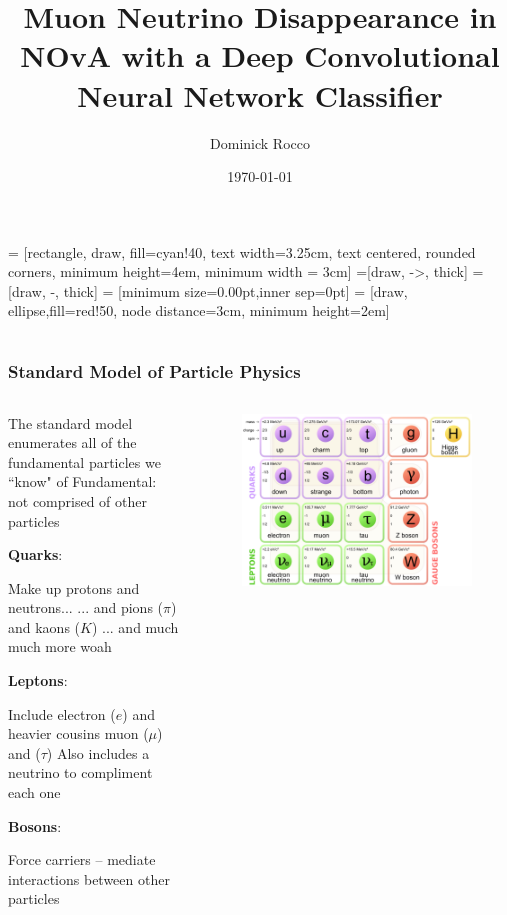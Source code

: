 \documentclass[10pt,professionalfonts,xcolor=table]{beamer}
\title[\numu Disappearance CNN]{Muon Neutrino Disappearance in NOvA with a Deep Convolutional Neural Network Classifier}
\author[D. Rocco]{Dominick Rocco}
\date{\today}
\institute{University of Minnesota}
\begin{document}
 = [rectangle, draw, fill=cyan!40,
   text width=3.25cm, text centered, rounded corners, minimum height=4em, minimum width = 3cm]
=[draw, ->, thick]
=[draw, -, thick]
 = [minimum size=0.00pt,inner sep=0pt]
 = [draw, ellipse,fill=red!50, node distance=3cm,
   minimum height=2em]

\frame{\titlepage}

\section[Outline]{}

\frame
{
  \frametitle{Standard Model of Particle Physics}

\begin{columns}[c]
  \begin{itemize}
  \bang The standard model enumerates all of the fundamental particles we ``know" of
  \bang Fundamental: not comprised of other particles

  \bang \textbf{Quarks}:
    \begin{itemize}
    \bing Make up protons and neutrons...
    \bong ... and pions ($\pi$) and kaons ($K$)
    \bong ... and much much more woah

    \end{itemize}
  \bang \textbf{Leptons}:
    \begin{itemize}
    \bing Include electron ($e$) and heavier cousins muon ($\mu$) and ($\tau$)
    \bing Also includes a neutrino to compliment each one
    \end{itemize}
  \bang \textbf{Bosons}:
    \begin{itemize}
    \bing Force carriers -- mediate interactions between other particles
    \end{itemize}

  \end{itemize}
    \begin{figure}
  \includegraphics[width=\textwidth]{figures/figures/sm.png}
  \end{figure}
\end{columns}

}
\end{document}
